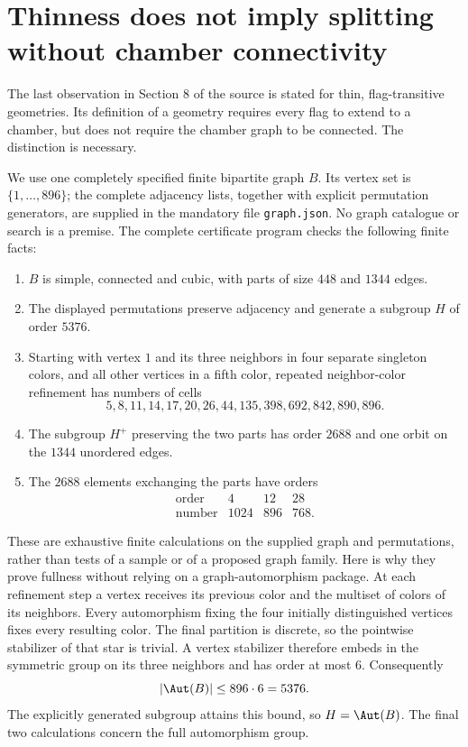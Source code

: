 \section{Thinness does not imply splitting without chamber connectivity}
The last observation in Section 8 of the source is stated for thin,
flag-transitive geometries. Its definition of a geometry requires every
flag to extend to a chamber, but does not require the chamber graph to
be connected. The distinction is necessary.

We use one completely specified finite bipartite graph $B$. Its vertex
set is $\{1,\ldots,896\}$; the complete adjacency lists, together with
explicit permutation generators, are supplied in the mandatory file
\texttt{graph.json}. No graph catalogue or search is a premise.
The complete certificate program checks the following finite facts:
\begin{enumerate}
\item $B$ is simple, connected and cubic, with parts of size $448$ and
$1344$ edges.
\item The displayed permutations preserve adjacency and generate a
subgroup $H$ of order $5376$.
\item Starting with vertex $1$ and its three neighbors in four separate
singleton colors, and all other vertices in a fifth color, repeated
neighbor-color refinement has numbers of cells
\[
5,8,11,14,17,20,26,44,135,398,692,842,890,896.
\]
\item The subgroup $H^+$ preserving the two parts has order $2688$ and
one orbit on the $1344$ unordered edges.
\item The $2688$ elements exchanging the parts have orders
\[
\begin{array}{c|rrr}
\text{order}&4&12&28\\\hline
\text{number}&1024&896&768.
\end{array}
\]
\end{enumerate}
These are exhaustive finite calculations on the supplied graph and
permutations, rather than tests of a sample or of a proposed graph family.
Here is why they prove fullness without relying on a graph-automorphism
package. At each refinement step a vertex receives its previous color
and the multiset of colors of its neighbors. Every automorphism fixing
the four initially distinguished vertices fixes every resulting color.
The final partition is discrete, so the pointwise stabilizer of that
star is trivial. A vertex stabilizer therefore embeds in the symmetric
group on its three neighbors and has order at most $6$. Consequently
\[
 |\Aut(B)|\le 896\cdot6=5376.
\]
The explicitly generated subgroup attains this bound, so $H=\Aut(B)$.
The final two calculations concern the full automorphism group.

